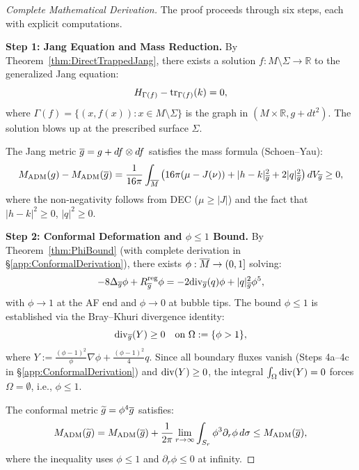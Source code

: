 \begin{proof}[Complete Mathematical Derivation]
The proof proceeds through six steps, each with explicit computations.

\textbf{Step 1: Jang Equation and Mass Reduction.}
By Theorem~\ref{thm:DirectTrappedJang}, there exists a solution $f: M \setminus \Sigma \to \mathbb{R}$ to the generalized Jang equation:
\begin{equation}\label{eq:GJEFinal}
    H_{\Gamma(f)} - \mathrm{tr}_{\Gamma(f)}(k) = 0,
\end{equation}
where $\Gamma(f) = \{(x, f(x)) : x \in M \setminus \Sigma\}$ is the graph in $(M \times \mathbb{R}, g + dt^2)$. The solution blows up at the prescribed surface $\Sigma$.

The Jang metric $\overline{g} = g + df \otimes df$ satisfies the mass formula (Schoen--Yau):
\begin{equation}\label{eq:JangMassFinal}
    M_{\mathrm{ADM}}(g) - M_{\mathrm{ADM}}(\overline{g}) = \frac{1}{16\pi} \int_{\overline{M}} \left( 16\pi(\mu - J(\nu)) + |h - k|^2_{\overline{g}} + 2|q|^2_{\overline{g}} \right) dV_{\overline{g}} \ge 0,
\end{equation}
where the non-negativity follows from DEC ($\mu \ge |J|$) and the fact that $|h-k|^2 \ge 0$, $|q|^2 \ge 0$.

\textbf{Step 2: Conformal Deformation and $\phi \le 1$ Bound.}
By Theorem~\ref{thm:PhiBound} (with complete derivation in \S\ref{app:ConformalDerivation}), there exists $\phi: \overline{M} \to (0, 1]$ solving:
\begin{equation}\label{eq:LichFinal}
    -8\Delta_{\overline{g}}\phi + R_{\overline{g}}^{\mathrm{reg}}\phi = -2\mathrm{div}_{\overline{g}}(q)\phi + |q|^2_{\overline{g}}\phi^5,
\end{equation}
with $\phi \to 1$ at the AF end and $\phi \to 0$ at bubble tips. The bound $\phi \le 1$ is established via the Bray--Khuri divergence identity:
\begin{equation}\label{eq:BKIdentityFinal}
    \mathrm{div}_{\overline{g}}(Y) \ge 0 \quad \text{on } \Omega := \{\phi > 1\},
\end{equation}
where $Y := \frac{(\phi-1)^2}{\phi}\nabla\phi + \frac{(\phi-1)^2}{4}q$. Since all boundary fluxes vanish (Steps 4a--4c in \S\ref{app:ConformalDerivation}) and $\mathrm{div}(Y) \ge 0$, the integral $\int_\Omega \mathrm{div}(Y) = 0$ forces $\Omega = \emptyset$, i.e., $\phi \le 1$.

The conformal metric $\widetilde{g} = \phi^4 \overline{g}$ satisfies:
\begin{equation}\label{eq:MassReductionFinal}
    M_{\mathrm{ADM}}(\widetilde{g}) = M_{\mathrm{ADM}}(\overline{g}) + \frac{1}{2\pi} \lim_{r \to \infty} \int_{S_r} \phi^3 \partial_r \phi \, d\sigma \le M_{\mathrm{ADM}}(\overline{g}),
\end{equation}
where the inequality uses $\phi \le 1$ and $\partial_r \phi \le 0$ at infinity.


\end{proof}
